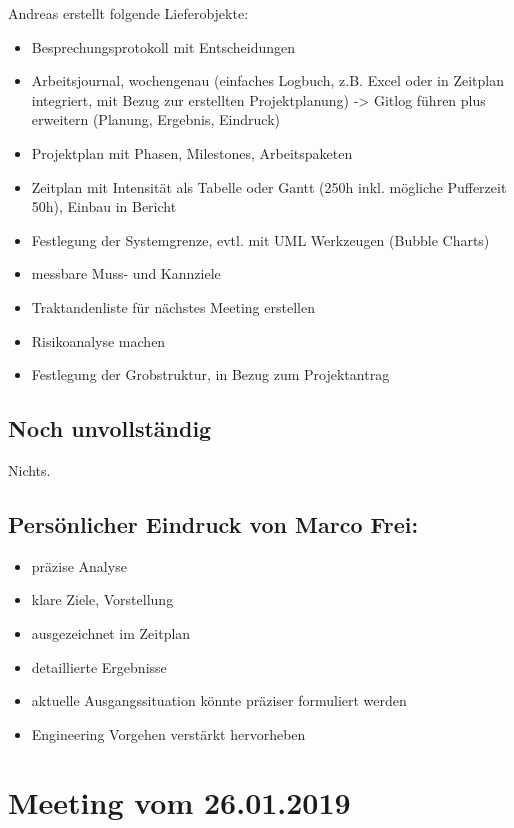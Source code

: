 \documentclass[a4paper,11pt]{article}
\begin{document}
Andreas erstellt folgende Lieferobjekte:
\begin{itemize}
\item Besprechungsprotokoll mit Entscheidungen
\item Arbeitsjournal, wochengenau (einfaches Logbuch, z.B. Excel oder in Zeitplan
integriert, mit Bezug zur erstellten Projektplanung) -> Gitlog führen plus
erweitern (Planung, Ergebnis, Eindruck)
\item Projektplan mit Phasen, Milestones, Arbeitspaketen
\item Zeitplan mit Intensität als Tabelle oder Gantt (250h inkl. mögliche
Pufferzeit 50h), Einbau in Bericht
\item Festlegung der Systemgrenze, evtl. mit UML Werkzeugen (Bubble Charts)
\item messbare Muss- und Kannziele
\item Traktandenliste für nächstes Meeting erstellen
\item Risikoanalyse machen
\item Festlegung der Grobstruktur, in Bezug zum Projektantrag
\end{itemize}

\subsection*{Noch unvollständig}
\label{sec:orgc7259b5}

Nichts.

\subsection*{Persönlicher Eindruck von Marco Frei:}
\label{sec:orga54b0a7}

\begin{itemize}
\item präzise Analyse
\item klare Ziele, Vorstellung
\item ausgezeichnet im Zeitplan
\item detaillierte Ergebnisse
\item aktuelle Ausgangssituation könnte präziser formuliert werden
\item Engineering Vorgehen verstärkt hervorheben
\end{itemize}



\section*{Meeting vom 26.01.2019}
\label{sec:orgcd851ef}
\end{document}
